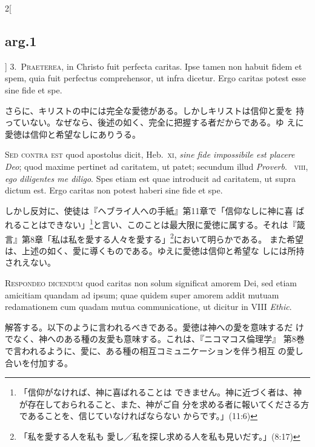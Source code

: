 \documentclass[paper=a4paper,fontsize=10pt,jafontsize=9pt,titlepage]{jlreq}
\begin{document}
\begin{paracol}{2}[\subsection{arg.1}]
3.~{\scshape Praeterea}, in Christo fuit perfecta caritas. Ipse tamen
non habuit fidem et spem, quia fuit perfectus comprehensor, ut infra
dicetur. Ergo caritas potest esse sine fide et spe.

\switchcolumn

さらに、キリストの中には完全な愛徳がある。しかしキリストは信仰と愛を
 持っていない。なぜなら、後述の如く、完全に把握する者だからである。ゆ
 えに愛徳は信仰と希望なしにありうる。

\switchcolumn*[\subsection{s.c.}]

{\scshape Sed contra est} quod apostolus dicit, Heb.~{\scshape xi},
{\itshape sine fide impossibile est placere Deo}; quod maxime pertinet
ad caritatem, ut patet; secundum illud {\itshape Proverb}.~{\scshape
viii}, {\itshape ego diligentes me diligo}. Spes etiam est quae
introducit ad caritatem, ut supra dictum est. Ergo caritas non potest
haberi sine fide et spe.

\switchcolumn

しかし反対に、使徒は『ヘブライ人への手紙』第11章で「信仰なしに神に喜
 ばれることはできない」\footnote{「信仰がなければ、神に喜ばれることは
 できません。神に近づく者は、神が存在しておられること、また、神がご自
 分を求める者に報いてくださる方であることを、信じていなければならない
 からです。」(11:6)}と言い、このことは最大限に愛徳に属する。それは『箴
 言』第8章「私は私を愛する人々を愛する」\footnote{「私を愛する人を私も
 愛し／私を探し求める人を私も見いだす。」(8:17)}において明らかである。
 また希望は、上述の如く、愛に導くものである。ゆえに愛徳は信仰と希望な
 しには所持されえない。


{\scshape Respondeo dicendum} quod caritas non solum significat amorem
Dei, sed etiam amicitiam quandam ad ipsum; quae quidem super amorem
addit mutuam redamationem cum quadam mutua communicatione, ut dicitur
 in VIII {\itshape Ethic}.

\switchcolumn

解答する。以下のように言われるべきである。愛徳は神への愛を意味するだ
 けでなく、神へのある種の友愛も意味する。これは、『ニコマコス倫理学』
 第8巻で言われるように、愛に、ある種の相互コミュニケーションを伴う相互
 の愛し合いを付加する。


\end{paracol}
\end{document}
